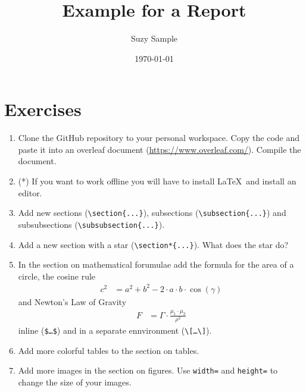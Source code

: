 \documentclass[12pt,a4paper]{article} %
\title{Example for a Report}
\date{\today}
\author{Suzy Sample}
\begin{document}
\section*{Exercises}
\begin{enumerate}
	\item Clone the GitHub repository to your personal workspace. Copy the code and paste it into an overleaf document (\url{https://www.overleaf.com/}). Compile the document.
	\item (*) If you want to work offline you will have to install \LaTeX\ and install an editor.
\item Add new sections (\verb|\section{...}|), subsections (\verb|\subsection{...}|) and subsubsections (\verb|\subsubsection{...}|). 
\item Add a new section with a star (\verb|\section*{...}|). What does the star do?
\item 	In the section on mathematical forumulae add the formula for the area of a circle, the cosine rule 
	\begin{align*}
		c^2 &= a^2 + b^2 - 2 \cdot  a \cdot  b \cdot  \cos (\gamma)
	\end{align*}
	and Newton's Law of Gravity
	\begin{align*}
		F &= \Gamma \cdot  \frac{\mu_1 \cdot  \mu_2}{\rho^2}
	\end{align*}
	inline  (\texttt{\$\dots\$}) and in a separate ennvironment (\texttt{\textbackslash[\ldots\textbackslash]}).
	\item Add more colorful tables to the section on tables.
	\item Add more images in the section on figures. Use \texttt{width=} and \texttt{height=} to change the size of your images.

\end{enumerate}
\end{document}
